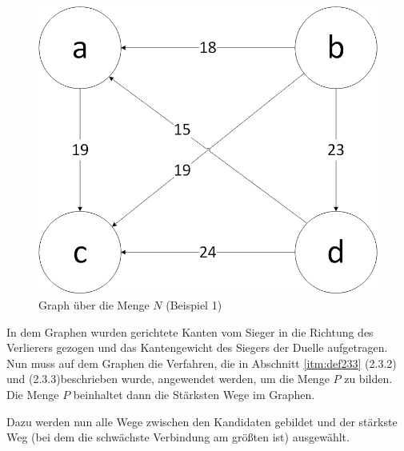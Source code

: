\begin{figure}[!h]
\centering
\includegraphics[scale=0.5]{Bilder/Beispiel1_Graph.png}
\caption{Graph über die Menge $N$ (Beispiel 1)}
\label{fig:graph1}
\end{figure}

In dem Graphen wurden gerichtete Kanten vom Sieger in die Richtung des Verlierers gezogen und das Kantengewicht des Siegers der Duelle aufgetragen. Nun muss auf dem Graphen die Verfahren, die in Abschnitt \ref{itm:def233} (2.3.2) und  (2.3.3)beschrieben wurde, angewendet werden, um die Menge $P$ zu bilden. Die Menge $P$ beinhaltet dann die Stärksten Wege im Graphen.

Dazu werden nun alle Wege zwischen den Kandidaten gebildet und der stärkste Weg (bei dem die schwächste Verbindung am größten ist) ausgewählt.

